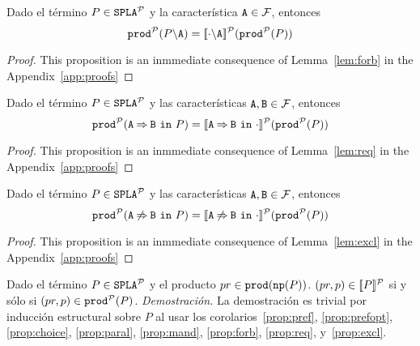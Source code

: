 \bprop\label{cor:forb}
  Dado el término $P\in\fodaPAp$ y la característica $\feature{A}\in\calF$, entonces 
  $$\prodp(\forbid{A}{P})=\semdenp{\forbid{A}{\cdot}}(\prodp(P))$$
\begin{proof}
  This proposition is an inmmediate consequence of
  Lemma~\ref{lem:forb} in the Appendix~\ref{app:proofs}
\end{proof}
\eprop

\bprop\label{prop:req}
  Dado el término $P\in\fodaPAp$ y las características $\feature{A},\feature{B}\in\calF$,
  entonces
  \begin{displaymath}
    \prodp(\require{A}{B}{P})=\semdenp{\require{A}{B}{\cdot}}(\prodp(P))
  \end{displaymath}
\begin{proof}
  This proposition is an inmmediate consequence of
  Lemma~\ref{lem:req} in the Appendix~\ref{app:proofs}
\end{proof}
\eprop

\bprop\label{prop:excl}
  Dado el término $P\in\fodaPAp$ y las características $\feature{A},\feature{B}\in\calF$, entonces
  \begin{displaymath}
    \prodp(\exclude{A}{B}{P})=\semdenp{\exclude{A}{B}{\cdot}}(\prodp(P))
  \end{displaymath}
\begin{proof}
  This proposition is an inmmediate consequence of
  Lemma~\ref{lem:excl} in the Appendix~\ref{app:proofs}
\end{proof}
\eprop

\bthm\label{prop:equivprob}
  Dado el término $P\in\fodaPAp$ y el producto $pr\in\prod(\np(P))$. $(pr,p)\in\semdenp{P}$ si y sólo si
  $(pr,p)\in\prodp(P)$.
  \textit{Demostración.}
    La demostración es trivial por inducción estructural sobre $P$
    al usar los corolarios~\ref{prop:pref}, \ref{prop:prefopt}, \ref{prop:choice},
    \ref{prop:paral},  \ref{prop:mand}, \ref{prop:forb}, \ref{prop:req}, y~\ref{prop:excl}.
\ethm


  
